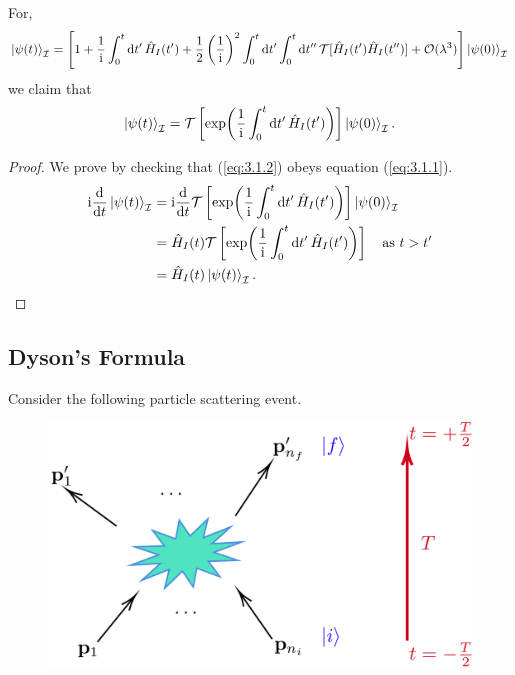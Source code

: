 \documentclass[a4paper,11pt]{article}
\begin{document}
	\begin{clm}
		For,
	\[
		\ket{\psi(t)}_{\mathcal{I}} = \left[ 1 + \frac{1}{\mathrm{i}} \int_{0}^{t} \dd{t'} \hat H_I (t') + \frac{1}{2} \left( \frac{1}{\mathrm{i}} \right)^2 \int_{0}^{t} \dd{t'} \int_{0}^{t} \dd{t''} \mathcal{T}[\hat H_I(t') \hat H_I(t'')] + \mathcal{O}(\lambda^3) \right] \ket{\psi(0)}_{\mathcal{I}}
	\]
	we claim that 
	\begin{equation}
		\ket{\psi(t)}_{\mathcal{I}} = \mathcal{T}\left[ \exp(\frac{1}{\mathrm{i}}\int_{0}^{t}\dd{t'}\hat H_I(t')) \right] \ket{\psi(0)}_{\mathcal{I}}.
		\label{eq:3.1.2}
	\end{equation}
	\end{clm}
	\begin{proof}
		We prove by checking that (\ref{eq:3.1.2}) obeys equation (\ref{eq:3.1.1}).
		\begin{align*}
			\mathrm{i} \dv{t}\ket{\psi(t)}_{\mathcal{I}} & = \mathrm{i} \dv{t} \mathcal{T}\left[ \exp(\frac{1}{\mathrm{i}}\int_{0}^{t}\dd{t'}\hat H_I(t')) \right] \ket{\psi(0)}_{\mathcal{I}}\\
			& = \hat H_I (t) \mathcal{T}\left[ \exp(\frac{1}{\mathrm{i}} \int_{0}^{t}\dd{t'} \hat H_I (t')) \right] \quad \text{as }t>t'\\
			& = \hat H_I(t) \ket{\psi(t)}_{\mathcal{I}}. \qedhere
		\end{align*}
	\end{proof}
	
	\subsection{Dyson's Formula}

	Consider the following particle scattering event.
	
	\begin{figure}[H]
		\centering
		\includegraphics[width=0.5\linewidth]{fig/n_i-n_f.pdf}
	\end{figure}
	
\end{document}
